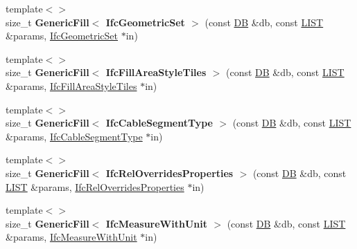 \begin{DoxyCompactItemize}
\item 
\hypertarget{namespace_assimp_1_1_s_t_e_p_a04caeea58c6795d63c67809a203da352}{{\footnotesize template$<$$>$ }\\size\+\_\+t {\bfseries Generic\+Fill$<$ Ifc\+Geometric\+Set $>$} (const \hyperlink{class_assimp_1_1_s_t_e_p_1_1_d_b}{D\+B} \&db, const \hyperlink{class_assimp_1_1_s_t_e_p_1_1_e_x_p_r_e_s_s_1_1_l_i_s_t}{L\+I\+S\+T} \&params, \hyperlink{struct_assimp_1_1_i_f_c_1_1_ifc_geometric_set}{Ifc\+Geometric\+Set} $\ast$in)}\label{namespace_assimp_1_1_s_t_e_p_a04caeea58c6795d63c67809a203da352}

\item 
\hypertarget{namespace_assimp_1_1_s_t_e_p_a85901fd635aa2ff04d9650cc72bd3d07}{{\footnotesize template$<$$>$ }\\size\+\_\+t {\bfseries Generic\+Fill$<$ Ifc\+Fill\+Area\+Style\+Tiles $>$} (const \hyperlink{class_assimp_1_1_s_t_e_p_1_1_d_b}{D\+B} \&db, const \hyperlink{class_assimp_1_1_s_t_e_p_1_1_e_x_p_r_e_s_s_1_1_l_i_s_t}{L\+I\+S\+T} \&params, \hyperlink{struct_assimp_1_1_i_f_c_1_1_ifc_fill_area_style_tiles}{Ifc\+Fill\+Area\+Style\+Tiles} $\ast$in)}\label{namespace_assimp_1_1_s_t_e_p_a85901fd635aa2ff04d9650cc72bd3d07}

\item 
\hypertarget{namespace_assimp_1_1_s_t_e_p_abd4f75fd1fa33986083d0acd456444f1}{{\footnotesize template$<$$>$ }\\size\+\_\+t {\bfseries Generic\+Fill$<$ Ifc\+Cable\+Segment\+Type $>$} (const \hyperlink{class_assimp_1_1_s_t_e_p_1_1_d_b}{D\+B} \&db, const \hyperlink{class_assimp_1_1_s_t_e_p_1_1_e_x_p_r_e_s_s_1_1_l_i_s_t}{L\+I\+S\+T} \&params, \hyperlink{struct_assimp_1_1_i_f_c_1_1_ifc_cable_segment_type}{Ifc\+Cable\+Segment\+Type} $\ast$in)}\label{namespace_assimp_1_1_s_t_e_p_abd4f75fd1fa33986083d0acd456444f1}

\item 
\hypertarget{namespace_assimp_1_1_s_t_e_p_af1a4fcbda9c983ec8bc5d8e79bfe4771}{{\footnotesize template$<$$>$ }\\size\+\_\+t {\bfseries Generic\+Fill$<$ Ifc\+Rel\+Overrides\+Properties $>$} (const \hyperlink{class_assimp_1_1_s_t_e_p_1_1_d_b}{D\+B} \&db, const \hyperlink{class_assimp_1_1_s_t_e_p_1_1_e_x_p_r_e_s_s_1_1_l_i_s_t}{L\+I\+S\+T} \&params, \hyperlink{struct_assimp_1_1_i_f_c_1_1_ifc_rel_overrides_properties}{Ifc\+Rel\+Overrides\+Properties} $\ast$in)}\label{namespace_assimp_1_1_s_t_e_p_af1a4fcbda9c983ec8bc5d8e79bfe4771}

\item 
\hypertarget{namespace_assimp_1_1_s_t_e_p_a3b58be57af8f8e9f185e866e99e3ce9b}{{\footnotesize template$<$$>$ }\\size\+\_\+t {\bfseries Generic\+Fill$<$ Ifc\+Measure\+With\+Unit $>$} (const \hyperlink{class_assimp_1_1_s_t_e_p_1_1_d_b}{D\+B} \&db, const \hyperlink{class_assimp_1_1_s_t_e_p_1_1_e_x_p_r_e_s_s_1_1_l_i_s_t}{L\+I\+S\+T} \&params, \hyperlink{struct_assimp_1_1_i_f_c_1_1_ifc_measure_with_unit}{Ifc\+Measure\+With\+Unit} $\ast$in)}\label{namespace_assimp_1_1_s_t_e_p_a3b58be57af8f8e9f185e866e99e3ce9b}


\end{DoxyCompactItemize}
